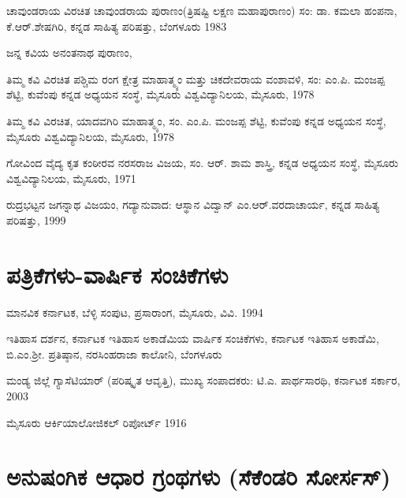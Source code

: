 \noindent
ಚಾವುಂಡರಾಯ ವಿರಚಿತ ಚಾವುಂಡರಾಯ ಪುರಾಣಂ(ತ್ರಿಷಷ್ಟಿ ಲಕ್ಷಣ ಮಹಾಪುರಾಣಂ) ಸಂ: ಡಾ. ಕಮಲಾ ಹಂಪನಾ, ಕೆ.ಆರ್​.ಶೇಷಗಿರಿ, ಕನ್ನಡ ಸಾಹಿತ್ಯ ಪರಿಷತ್ತು, ಬೆಂಗಳೂರು 1983

\noindent
ಜನ್ನ ಕವಿಯ ಅನಂತನಾಥ ಪುರಾಣಂ,

\noindent
ತಿಮ್ಮ ಕವಿ ವಿರಚಿತ ಪಶ್ಚಿಮ ರಂಗ ಕ್ಷೇತ್ರ ಮಾಹಾತ್ಮ್ಯಂ ಮತ್ತು ಚಿಕದೇವರಾಯ ವಂಶಾವಳಿ, ಸಂ: ಎಂ.ಪಿ. ಮಂಜಪ್ಪ ಶೆಟ್ಟಿ, ಕುವೆಂಪು ಕನ್ನಡ ಅಧ್ಯಯನ ಸಂಸ್ಥೆ, ಮೈಸೂರು ವಿಶ್ವವಿದ್ಯಾನಿಲಯ, ಮೈಸೂರು, 1978

\noindent
ತಿಮ್ಮ ಕವಿ ವಿರಚಿತ, ಯಾದವಗಿರಿ ಮಾಹಾತ್ಮ್ಯಂ, ಸಂ. ಎಂ.ಪಿ. ಮಂಜಪ್ಪ ಶೆಟ್ಟಿ, ಕುವೆಂಪು ಕನ್ನಡ ಅಧ್ಯಯನ ಸಂಸ್ಥೆ, ಮೈಸೂರು ವಿಶ್ವವಿದ್ಯಾನಿಲಯ, ಮೈಸೂರು, 1978

\noindent
ಗೋವಿಂದ ವೈದ್ಯ ಕೃತ ಕಂಠೀರವ ನರಸರಾಜ ವಿಜಯ, ಸಂ. ಆರ್​. ಶಾಮ ಶಾಸ್ತ್ರಿ, ಕನ್ನಡ ಅಧ್ಯಯನ ಸಂಸ್ಥೆ, ಮೈಸೂರು ವಿಶ್ವವಿದ್ಯಾನಿಲಯ, ಮೈಸೂರು, 1971

\noindent
ರುದ್ರಭಟ್ಟನ ಜಗನ್ನಾಥ ವಿಜಯಂ, ಗದ್ಯಾನುವಾದ: ಆಸ್ಥಾನ ವಿದ್ವಾನ್​ ಎಂ.ಆರ್​.ವರದಾಚಾರ್ಯ, ಕನ್ನಡ ಸಾಹಿತ್ಯ ಪರಿಷತ್ತು, 1999


\section*{ಪತ್ರಿಕೆಗಳು-ವಾರ್ಷಿಕ ಸಂಚಿಕೆಗಳು}

\noindent
ಮಾನವಿಕ ಕರ್ನಾಟಕ, ಬೆಳ್ಳಿ ಸಂಪುಟ, ಪ್ರಸಾರಾಂಗ, ಮೈಸೂರು, ವಿವಿ. 1994

\noindent
ಇತಿಹಾಸ ದರ್ಶನ, ಕರ್ನಾಟಕ ಇತಿಹಾಸ ಅಕಾಡೆಮಿಯ ವಾರ್ಷಿಕ ಸಂಚಿಕೆಗಳು, ಕರ್ನಾಟಕ ಇತಿಹಾಸ ಅಕಾಡೆಮಿ, ಬಿ.ಎಂ.ಶ‍್ರೀ. ಪ್ರತಿಷ್ಠಾನ, ನರಸಿಂಹರಾಜಾ ಕಾಲೋನಿ, ಬೆಂಗಳೂರು

\noindent
ಮಂಡ್ಯ ಜಿಲ್ಲೆ ಗ್ಯಾಸೆಟಿಯಾರ್​ (ಪರಿಷ್ಕೃತ ಆವೃತ್ತಿ), ಮುಖ್ಯ ಸಂಪಾದಕರು: ಟಿ.ಎ. ಪಾರ್ಥಸಾರಥಿ, ಕರ್ನಾಟಕ ಸರ್ಕಾರ, 2003

\noindent
ಮೈಸೂರು ಆರ್ಕಿಯಾಲೋಜಿಕಲ್​ ರಿಪೋರ್ಟ್ 1916


\section*{ಅನುಷಂಗಿಕ ಆಧಾರ ಗ್ರಂಥಗಳು (ಸೆಕೆಂಡರಿ ಸೋರ್ಸಸ್​)}

